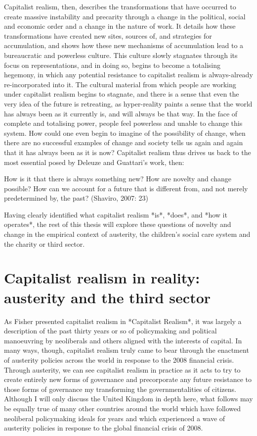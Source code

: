 Capitalist realism, then, describes the transformations that have
occurred to create massive instability and precarity through a change in
the political, social and economic order and a change in the nature of
work. It details how these transformations have created new sites,
sources of, and strategies for accumulation, and shows how these new
mechanisms of accumulation lead to a bureaucratic and powerless culture.
This culture slowly stagnates through its focus on representations, and
in doing so, begins to become a totalising hegemony, in which any
potential resistance to capitalist realism is always-already
re-incorporated into it. The cultural material from which people are
working under capitalist realism begins to stagnate, and there is a
sense that even the very idea of the future is retreating, as
hyper-reality paints a sense that the world has always been as it
currently is, and will always be that way. In the face of complete and
totalising power, people feel powerless and unable to change this
system. How could one even begin to imagine of the possibility of
change, when there are no successful examples of change and society
tells us again and again that it has always been as it is now?
Capitalist realism thus drives us back to the most essential posed by
Deleuze and Guattari's work, then:

How is it that there is always something new? How are novelty and change
possible? How can we account for a future that is different from, and
not merely predetermined by, the past? (Shaviro, 2007: 23)

Having clearly identified what capitalist realism *is*, *does*, and *how
it operates*, the rest of this thesis will explore these questions of
novelty and change in the empirical context of austerity, the children's
social care system and the charity or third sector.


\section{Capitalist realism in reality: austerity and the third sector}
\label{capitalist-realism-in-reality-austerity-and-the-third-sector}

As Fisher presented capitalist realism in *Capitalist Realism*, it was
largely a description of the past thirty years or so of policymaking and
political manoeuvring by neoliberals and others aligned with the
interests of capital. In many ways, though, capitalist realism truly
came to bear through the enactment of austerity policies across the
world in response to the 2008 financial crisis. Through austerity, we
can see capitalist realism in practice as it acts to try to create
entirely new forms of governance and precorporate any future resistance
to those forms of governance my transforming the governmentalities of
citizens. Although I will only discuss the United Kingdom in depth here,
what follows may be equally true of many other countries around the
world which have followed neoliberal policymaking ideals for years and
which experienced a wave of austerity policies in response to the global
financial crisis of 2008.

